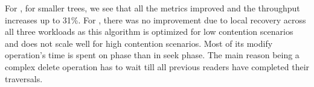 For \CASTLE{}, for smaller trees, we see that all the metrics improved and the throughput increases up to 31\%.
For \CITRUS{}, there was no improvement due to local recovery across all three workloads as this algorithm is optimized for low contention scenarios and does not scale well for high contention scenarios.
Most of its modify operation's time is spent on \action{} phase than in seek phase.
The main reason being a complex delete operation has to wait till all previous readers have completed their traversals.

\begin{comment}
From \figsrefc[ and ]{localRecovery-throughput-stampede-threadSweep-zipf-4Set-Relative}{localRecovery-seekTime-stampede-threadSweep-zipf-4Set-Relative}, we see a clear correlation between seek time and system throughput. As seek time reduces due to local recovery, the system throughput also improves. We see maximum improvement for \HJBST{}. Since \CASTLE{} and \CITRUS{} are lock-based algorithms, no helping is performed during tree traversal.  But in \HJBST{}, during the tree traversal, if a pending operation is seen it is helped and then the current operation is restarted. This results in frequent restarts and hence local recovery improves performance by a larger margin.
\end{comment}
